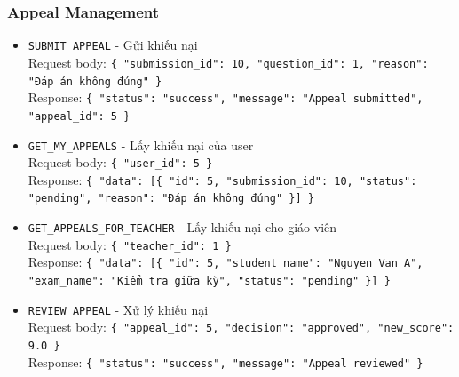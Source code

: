 \documentclass[12pt,a4paper]{report}
\newcommand{\json}[1]{\texttt{\allowbreak#1\allowbreak}}
\begin{document}
\subsubsection{Appeal Management}
\begin{itemize}
    \item \texttt{SUBMIT\_APPEAL} - Gửi khiếu nại \\
    Request body: \json{\{ "submission\_id": 10, "question\_id": 1, "reason": "Đáp án không đúng" \}} \\
    Response: \json{\{ "status": "success", "message": "Appeal submitted", "appeal\_id": 5 \}}
    \item \texttt{GET\_MY\_APPEALS} - Lấy khiếu nại của user \\
    Request body: \json{\{ "user\_id": 5 \}} \\
    Response: \json{\{ "data": [\{ "id": 5, "submission\_id": 10, "status": "pending", "reason": "Đáp án không đúng" \}] \}}
    \item \texttt{GET\_APPEALS\_FOR\_TEACHER} - Lấy khiếu nại cho giáo viên \\
    Request body: \json{\{ "teacher\_id": 1 \}} \\
    Response: \json{\{ "data": [\{ "id": 5, "student\_name": "Nguyen Van A", "exam\_name": "Kiểm tra giữa kỳ", "status": "pending" \}] \}}
    \item \texttt{REVIEW\_APPEAL} - Xử lý khiếu nại \\
    Request body: \json{\{ "appeal\_id": 5, "decision": "approved", "new\_score": 9.0 \}} \\
    Response: \json{\{ "status": "success", "message": "Appeal reviewed" \}}
\end{itemize}
\end{document}
